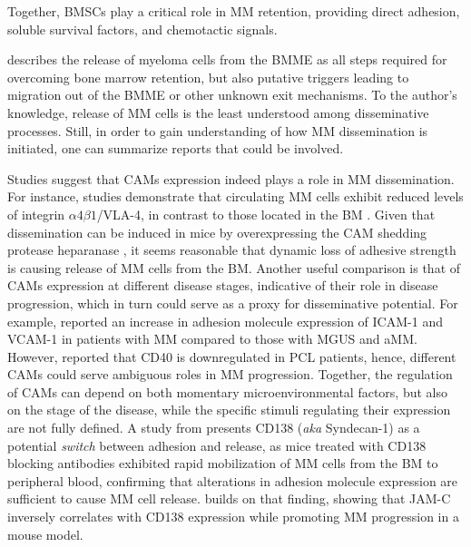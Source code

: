 Together, \acp{BMSC} play a critical role in \ac{MM} retention, providing direct
adhesion, soluble survival factors, and chemotactic signals.


%
\label{sec:intro_myeloma_release}%
\citet{zeissigTumourDisseminationMultiple2020} describes the release of myeloma
cells from the \ac{BMME} as all steps required for overcoming bone marrow
retention, but also putative triggers leading to migration out of the \ac{BMME}
or other unknown exit mechanisms. To the author's knowledge, release of \ac{MM}
cells is the least understood among disseminative processes. Still, in order to
gain understanding of how \ac{MM} dissemination is initiated, one can summarize
reports that could be involved.


Studies suggest that \acp{CAM} expression indeed plays a role in \ac{MM}
dissemination. For instance, studies demonstrate that circulating \ac{MM} cells
exhibit reduced levels of integrin $\alpha4\beta1$/VLA-4, in contrast to those located
in the \ac{BM} \cite{paivaDetailedCharacterizationMultiple2013,
    paivaCompetitionClonalPlasma2011}. Given that dissemination can be induced in
mice by overexpressing the \ac{CAM} shedding protease heparanase
\cite{yangHeparanasePromotesSpontaneous2005}, it seems reasonable that dynamic
loss of adhesive strength is causing release of \ac{MM} cells from the \ac{BM}.
Another useful comparison is that of \acp{CAM} expression at different disease
stages, indicative of their role in disease progression, which in turn could
serve as a proxy for disseminative potential. For example,
\citet{terposIncreasedCirculatingVCAM12016}
reported an increase in adhesion molecule expression of ICAM-1 and VCAM-1 in
patients with \ac{MM} compared to those with \ac{MGUS} and \ac{aMM}. However,
\citet{perez-andresClonalPlasmaCells2005} reported that CD40 is downregulated in
\ac{PCL} patients, hence, different \acp{CAM} could serve ambiguous roles in
\ac{MM} progression. Together, the regulation of \acp{CAM} can depend on both
momentary microenvironmental factors, but also on the stage of the disease,
while the specific stimuli regulating their expression are not fully defined. A
study from \citet{akhmetzyanovaDynamicCD138Surface2020} presents CD138
(\textit{aka} Syndecan-1) as a potential \textit{switch} between adhesion and
release, as mice treated with CD138 blocking antibodies exhibited
rapid mobilization of \ac{MM} cells from the \ac{BM} to peripheral blood,
confirming that alterations in adhesion molecule expression are sufficient to
cause \ac{MM} cell release. \citet{brandlJunctionalAdhesionMolecule2022}
builds on that finding, showing that JAM-C inversely correlates with CD138
expression while promoting \ac{MM} progression in a mouse model.


